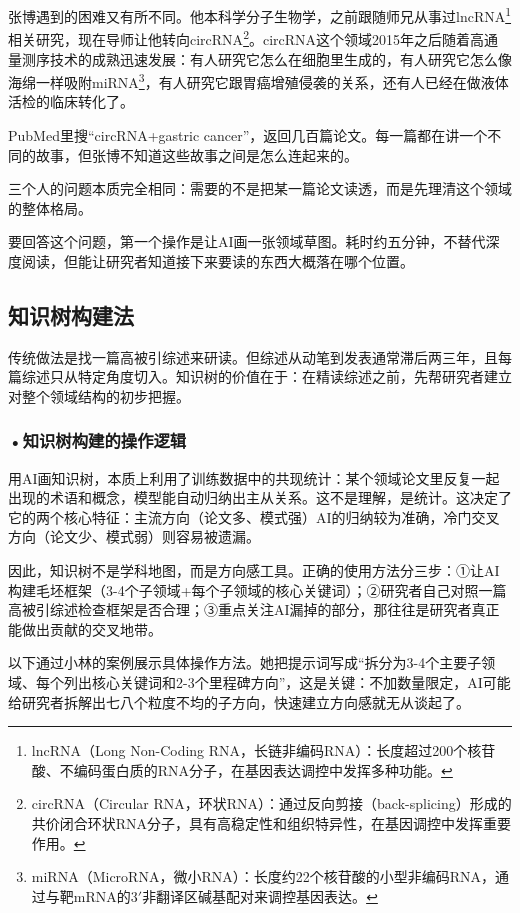 张博遇到的困难又有所不同。他本科学分子生物学，之前跟随师兄从事过lncRNA\footnote{lncRNA（Long Non-Coding RNA，长链非编码RNA）：长度超过200个核苷酸、不编码蛋白质的RNA分子，在基因表达调控中发挥多种功能。}相关研究，现在导师让他转向circRNA\footnote{circRNA（Circular RNA，环状RNA）：通过反向剪接（back-splicing）形成的共价闭合环状RNA分子，具有高稳定性和组织特异性，在基因调控中发挥重要作用。}。circRNA这个领域2015年之后随着高通量测序技术的成熟迅速发展：有人研究它怎么在细胞里生成的，有人研究它怎么像海绵一样吸附miRNA\footnote{miRNA（MicroRNA，微小RNA）：长度约22个核苷酸的小型非编码RNA，通过与靶mRNA的3$'$非翻译区碱基配对来调控基因表达。}，有人研究它跟胃癌增殖侵袭的关系，还有人已经在做液体活检的临床转化了。

PubMed里搜``circRNA+gastric cancer''，返回几百篇论文。每一篇都在讲一个不同的故事，但张博不知道这些故事之间是怎么连起来的。

三个人的问题本质完全相同：需要的不是把某一篇论文读透，而是先理清这个领域的整体格局。

要回答这个问题，第一个操作是让AI画一张领域草图。耗时约五分钟，不替代深度阅读，但能让研究者知道接下来要读的东西大概落在哪个位置。

\subsection{知识树构建法}

传统做法是找一篇高被引综述来研读。但综述从动笔到发表通常滞后两三年，且每篇综述只从特定角度切入。知识树的价值在于：在精读综述之前，先帮研究者建立对整个领域结构的初步把握。

\subsubsection*{\textbf{•知识树构建的操作逻辑}}用AI画知识树，本质上利用了训练数据中的共现统计：某个领域论文里反复一起出现的术语和概念，模型能自动归纳出主从关系。这不是理解，是统计。这决定了它的两个核心特征：主流方向（论文多、模式强）AI的归纳较为准确，冷门交叉方向（论文少、模式弱）则容易被遗漏。

因此，知识树不是学科地图，而是方向感工具。正确的使用方法分三步：①让AI构建毛坯框架（3-4个子领域+每个子领域的核心关键词）；②研究者自己对照一篇高被引综述检查框架是否合理；③重点关注AI漏掉的部分，那往往是研究者真正能做出贡献的交叉地带。

以下通过小林的案例展示具体操作方法。她把提示词写成``拆分为3-4个主要子领域、每个列出核心关键词和2-3个里程碑方向''，这是关键：不加数量限定，AI可能给研究者拆解出七八个粒度不均的子方向，快速建立方向感就无从谈起了。


